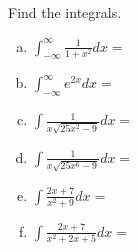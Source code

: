 \documentclass[answers]{exam}
\begin{document}
\begin{questions}
\question Find the integrals.

\begin{enumerate}[(a)]
	\item $\displaystyle \int_{-\infty}^{\infty} \frac{1}{1+x^2} dx =$
	
	\vspace{1in}
	
	\item $\displaystyle \int_{-\infty}^{\infty} e^{2x} dx =$
	
	\vspace{1in}
	
	\item $\displaystyle \int \frac{1}{x\sqrt{25x^2-9}} dx =$
	
	\vspace{1in}
	
	\item $\displaystyle \int \frac{1}{x\sqrt{25x^6-9}} dx =$
	
	\vspace{1in}
	
	\item $\displaystyle \int \frac{2x+7}{x^2+9} dx =$
	
	\vspace{1in}
	
	\item $\displaystyle \int \frac{2x+7}{x^2+2x+5} dx =$
	
	\vspace{1in}
\end{enumerate}




\end{questions}
\end{document}
